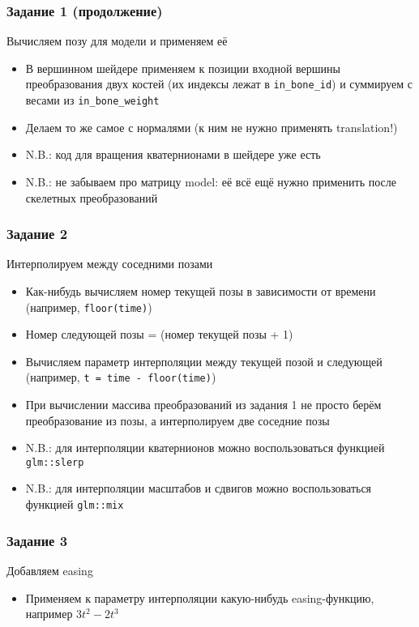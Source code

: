 \documentclass{beamer}
\begin{document}
\begin{frame}[fragile]
\frametitle{Задание 1 (продолжение)}
Вычисляем позу для модели и применяем её
\begin{itemize}
\item В вершинном шейдере применяем к позиции входной вершины преобразования двух костей (их индексы лежат в \verb|in_bone_id|) и суммируем с весами из \verb|in_bone_weight|
\pause
\item Делаем то же самое с нормалями (к ним не нужно применять translation!)
\pause
\item N.B.: код для вращения кватернионами в шейдере уже есть
\pause
\item N.B.: не забываем про матрицу model: её всё ещё нужно применить после скелетных преобразований
\end{itemize}
\end{frame}

\begin{frame}[fragile]
\frametitle{Задание 2}
Интерполируем между соседними позами
\begin{itemize}
\item Как-нибудь вычисляем номер текущей позы в зависимости от времени (например, \verb|floor(time)|)
\item Номер следующей позы = (номер текущей позы + 1) %
\pause
\item Вычисляем параметр интерполяции между текущей позой и следующей (например, \verb|t = time - floor(time)|)
\pause
\item При вычислении массива преобразований из задания 1 не просто берём преобразование из позы, а интерполируем две соседние позы
\pause
\item N.B.: для интерполяции кватернионов можно воспользоваться функцией \verb|glm::slerp|
\item N.B.: для интерполяции масштабов и сдвигов можно воспользоваться функцией \verb|glm::mix|
\end{itemize}
\end{frame}

\begin{frame}[fragile]
\frametitle{Задание 3}
Добавляем easing
\begin{itemize}
\item Применяем к параметру интерполяции какую-нибудь easing-функцию, например \begin{math}3t^2-2t^3\end{math}
\end{itemize}
\end{frame}
\end{document}
